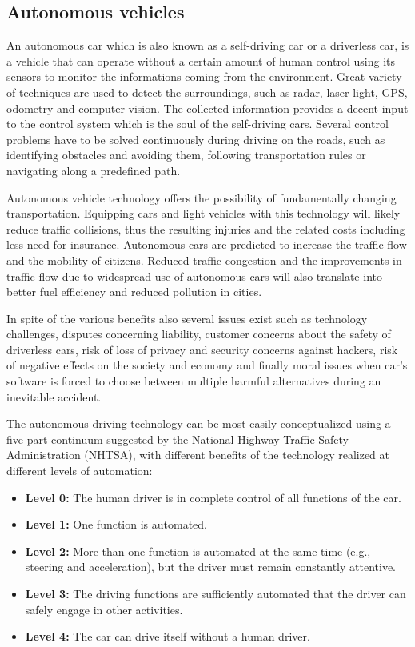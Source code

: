 \documentclass[12pt,english]{article}
\begin{document}
\subsection{Autonomous vehicles}
An autonomous car which is also known as a self-driving car or a driverless car, is a vehicle that can operate without a certain amount of human control using its sensors to monitor the informations coming from the environment. Great variety of techniques are used to detect the surroundings, such as radar, laser light, GPS, odometry and computer vision. The collected information provides a decent input to the control system which is the soul of the self-driving cars. Several control problems have to be solved continuously during driving on the roads, such as identifying obstacles and avoiding them, following transportation rules or navigating along a predefined path.

Autonomous vehicle technology offers the possibility of fundamentally
changing transportation. Equipping cars and light vehicles
with this technology will likely reduce traffic collisions, thus the resulting injuries and the related costs including less need for insurance. Autonomous cars are predicted to increase the traffic flow and the mobility of citizens. Reduced traffic congestion and the improvements in traffic flow due to widespread use of autonomous cars will also translate into better fuel efficiency and reduced pollution in cities.

In spite of the various benefits also several issues exist such as technology challenges, disputes concerning liability, customer concerns about the safety of driverless cars, risk of loss of privacy and security concerns against hackers, risk of negative effects on the society and economy and finally moral issues when car's software is forced to choose between multiple harmful alternatives during an inevitable accident. 
 

The autonomous driving technology can be most easily conceptualized using a five-part
continuum suggested by the National Highway Traffic Safety Administration
(NHTSA), with different benefits of the technology realized
at different levels of automation:
\begin{itemize}
	\item \textbf{Level 0:}  The human driver is in complete control of all functions of the car.
	\item \textbf{Level 1:}  One function is automated.
	\item \textbf{Level 2:}  More than one function is automated at the same time (e.g., steering and acceleration), but the driver must remain constantly attentive.
	\item \textbf{Level 3:} The driving functions are sufficiently automated that the driver can safely engage in other activities.
	\item \textbf{Level 4:} The car can drive itself without a human driver.\cite{c}
\end{itemize}
\noindent
\end{document}
